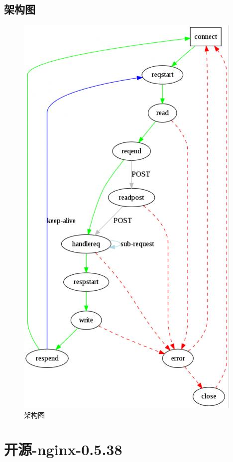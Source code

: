 \documentclass[UTF8,a4paper,8pt]{ctexbook}
\begin{document}
	\section{架构图}
		\begin{figure}[h]
			\centering
			\includegraphics[scale = 0.5]{lighttpd.jpg}
			\caption{架构图}
		\end{figure}
\chapter{开源-nginx-0.5.38}
\end{document}
